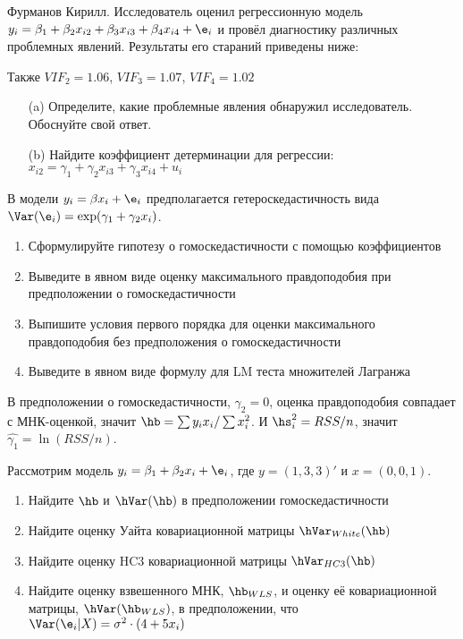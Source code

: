 \documentclass[pdftex,11pt,openany]{book}\usepackage[]{graphicx}\usepackage[]{color}
\begin{document}
\begin{problem}
Фурманов Кирилл. Исследователь оценил регрессионную модель $y_i = \beta_1 + \beta_2 x_{i2} + \beta_3 x_{i3} + \beta_4 x_{i4} + \e_i$ и провёл диагностику различных проблемных явлений. Результаты его стараний приведены ниже:



Также $VIF_2 = 1.06$, $VIF_3 = 1.07$, $VIF_4 = 1.02$
\begin{enumerate}
\item[(a)] Определите, какие проблемные явления обнаружил исследователь. Обоснуйте свой ответ.
\item[(b)] Найдите коэффициент детерминации для регрессии: $x_{i2} = \gamma_1 + \gamma_2 x_{i3} + \gamma_3 x_{i4} + u_i$
\end{enumerate}
\end{problem}


\begin{solution}
\end{solution}


\begin{problem}
В модели $y_i=\beta x_i+\e_i$ предполагается гетероскедастичность вида $\Var(\e_i)=\exp(\gamma_1+\gamma_2 x_i)$.
\begin{enumerate}
\item Сформулируйте гипотезу о гомоскедастичности с помощью коэффициентов
\item Выведите в явном виде оценку максимального правдоподобия при предположении о гомоскедастичности
\item Выпишите условия первого порядка для оценки максимального правдоподобия без предположения о гомоскедастичности
\item Выведите в явном виде формулу для LM теста множителей Лагранжа
\end{enumerate}
\end{problem}

\begin{solution}
В предположении о гомоскедастичности, $\gamma_2=0$, оценка правдоподобия совпадает с МНК-оценкой, значит $\hb=\sum y_i x_i/ \sum x_i^2$. И $\hs^2_i=RSS/n$, значит $\hat{\gamma_1}=\ln(RSS/n)$.
\end{solution}


\begin{problem}
Рассмотрим модель $y_i=\beta_1 + \beta_2 x_i + \e_i$, где $y=(1,3,3)'$ и $x=(0,0,1)$.
\begin{enumerate}
\item Найдите $\hb$ и $\hVar(\hb)$ в предположении гомоскедастичности
\item Найдите оценку Уайта ковариационной матрицы $\hVar_{White}(\hb)$
\item Найдите оценку HC3 ковариационной матрицы $\hVar_{HC3}(\hb)$
\item Найдите оценку взвешенного МНК, $\hb_{WLS}$, и оценку её ковариационной матрицы, $\hVar(\hb_{WLS})$, в предположении, что $\Var(\e_i|X)=\sigma^2 \cdot ( 4 + 5x_i)$
\end{enumerate}
\end{problem}
\end{document}
